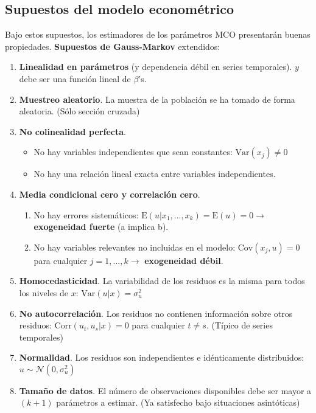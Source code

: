 \documentclass[10pt, a4paper, landscape]{extarticle}
\newcommand{\E}{\mathrm{E}}
\newcommand{\Var}{\mathrm{Var}}
\newcommand{\Cov}{\mathrm{Cov}}
\newcommand{\Corr}{\mathrm{Corr}}
\begin{document}
\begin{multicols}{3}
	\subsection*{Supuestos del modelo econométrico}
		Bajo estos supuestos, los estimadores de los parámetros MCO presentarán buenas propiedades. \textbf{Supuestos de Gauss-Markov} extendidos:
		\begin{enumerate}[leftmargin=*]
			\item \textbf{Linealidad en parámetros} (y dependencia débil en series temporales). $y$ debe ser una función lineal de $\beta$'s.
			\item \textbf{Muestreo aleatorio}. La muestra de la población se ha tomado de forma aleatoria. (Sólo sección cruzada)
			\item \textbf{No colinealidad perfecta}.
			\begin{itemize}[leftmargin=*]
				\item No hay variables independientes que sean constantes: $\Var(x_j) \neq 0$
				\item No hay una relación lineal exacta entre variables independientes.
			\end{itemize}
			\item \textbf{Media condicional cero y correlación cero}.
			\begin{enumerate}[leftmargin=*, label=\alph*.]
				\item No hay errores sistemáticos: $\E(u | x_1, ..., x_k) = \E(u) = 0 \rightarrow$ \textbf{exogeneidad fuerte} (a implica b).
				\item No hay variables relevantes no incluidas en el modelo: $\Cov(x_j , u) = 0$ para cualquier $j = 1, ..., k \rightarrow$ \textbf{exogeneidad débil}.
			\end{enumerate}
			\item \textbf{Homocedasticidad}. La variabilidad de los residuos es la misma para todos los niveles de $x$: $\Var(u | x) = \sigma^2_u$
			\item \textbf{No autocorrelación}. Los residuos no contienen información sobre otros residuos: $\Corr(u_t, u_s | x) = 0$ para cualquier $t \neq s$. (Típico de series temporales)
			\item \textbf{Normalidad}. Los residuos son independientes e idénticamente distribuidos: $u \sim \mathcal{N}(0,\sigma^2_u)$
			\item \textbf{Tamaño de datos}. El número de observaciones disponibles debe ser mayor a $(k + 1)$ parámetros a estimar. (Ya satisfecho bajo situaciones asintóticas)
		\end{enumerate}

\end{multicols}
\end{document}
